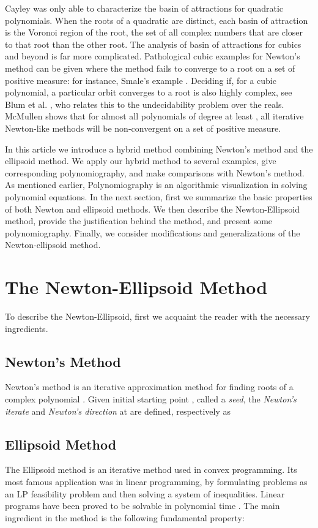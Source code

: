 \documentclass{article}
\begin{document}
Cayley was only able to characterize the basin of attractions for quadratic polynomials. When the roots of a quadratic are distinct, each basin of attraction is the Voronoi region of the root,  the set of all complex numbers that are closer to that root than the other root. The analysis of basin of attractions for cubics and beyond is far more complicated.  Pathological cubic examples for Newton's method can be given where the method fails to converge to a root on a set of positive measure: for instance, Smale's example .  Deciding if, for a cubic polynomial, a particular orbit converges to a root is also highly complex, see Blum et al. \cite{Blum}, who relates this to the undecidability problem over the reals. McMullen \cite{McMullen87} shows that for almost all polynomials of degree at least ,  all iterative Newton-like methods will be non-convergent on a set of positive measure.

In this article we introduce a hybrid method combining Newton's method and the ellipsoid method.  We apply our hybrid method to several examples, give  corresponding polynomiography, and make comparisons with Newton's method.  As mentioned earlier, Polynomiography is an algorithmic visualization in solving polynomial equations. In the next section, first we summarize the basic properties of both Newton and ellipsoid methods.  We then describe the Newton-Ellipsoid method, provide the justification behind the method, and present some polynomiography.  Finally, we consider modifications and generalizations of the Newton-ellipsoid method.

\section{The Newton-Ellipsoid Method}

To describe the Newton-Ellipsoid, first we acquaint the reader with the necessary ingredients.

\subsection{Newton's Method}
Newton’s method is an iterative approximation method for finding roots of a complex polynomial . Given initial starting point , called a  {\it seed}, the  \textit{Newton's iterate} and \textit{Newton's direction}
at  are defined, respectively  as


\subsection{Ellipsoid Method}
The Ellipsoid method is an iterative method used in convex programming. Its most famous application was in linear programming, by formulating problems as an LP feasibility problem and then solving a system of inequalities.  Linear programs have been proved to be solvable in polynomial time \cite{kha79}. The main ingredient in the method is the following fundamental property:
\end{document}
